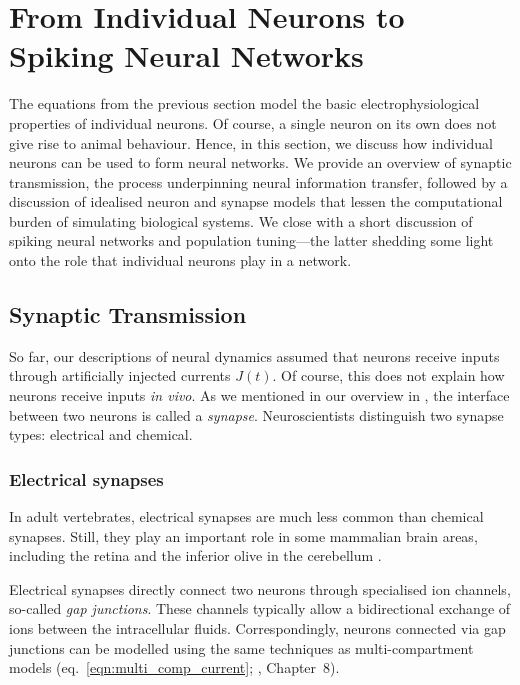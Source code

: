 
\section{From Individual Neurons to Spiking Neural Networks}
\label{sec:neuron_models}

The equations from the previous section model the basic electrophysiological properties of individual neurons.
Of course, a single neuron on its own does not give rise to animal behaviour.
Hence, in this section, we discuss how individual neurons can be used to form neural networks.
We provide an overview of synaptic transmission, the process underpinning neural information transfer, followed by a discussion of idealised neuron and synapse models that lessen the computational burden of simulating biological systems.
We close with a short discussion of spiking neural networks and population tuning---the latter shedding some light onto the role that individual neurons play in a network.


\subsection{Synaptic Transmission}
\label{sec:synaptic_transmission}

So far, our descriptions of neural dynamics assumed that neurons receive inputs through artificially injected currents $J(t)$.
Of course, this does not explain how neurons receive inputs \emph{in vivo}.
As we mentioned in our overview in , the interface between two neurons is called a \emph{synapse}.
Neuroscientists distinguish two synapse types: electrical and chemical.


\subsubsection{Electrical synapses}
In adult vertebrates, electrical synapses are much less common than chemical synapses.
Still, they play an important role in some mammalian brain areas, including the retina and the inferior olive in the cerebellum \citep[Chapter~5]{meriney2019synaptic}.

Electrical synapses directly connect two neurons through specialised ion channels, so-called \emph{gap junctions}.
These channels typically allow a bidirectional exchange of ions between the intracellular fluids.
Correspondingly, neurons connected via gap junctions can be modelled using the same techniques as multi-compartment models (eq.~\ref{eqn:multi_comp_current}; \cite{kandel2012principles}, Chapter~8).

